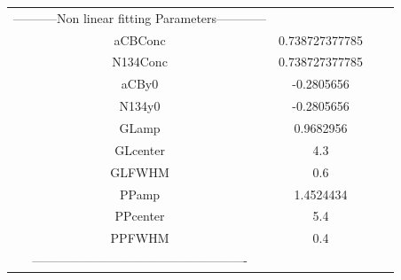 \documentclass{article}
\begin{document}
\begin{tabular}{c c c c}

-----------Non linear fitting Parameters------------\\
aCBConc    &0.738727377785\\
N134Conc   &0.738727377785\\
aCBy0      &-0.2805656\\
N134y0     &-0.2805656\\
GLamp      &0.9682956\\
GLcenter   &4.3\\
GLFWHM     &0.6\\
PPamp      &1.4524434\\
PPcenter   &5.4\\
PPFWHM     &0.4\\
----------------------------------------------------\\


\end{tabular}
\end{document}
